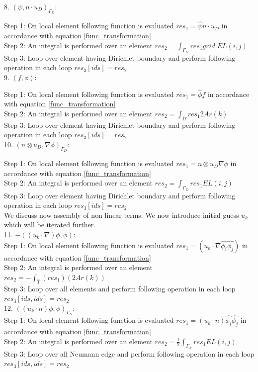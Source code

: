 \documentclass[a4paper]{book}
\begin{document}
8. $(\psi, n \cdot u_D)_{\Gamma_D} $:

Step 1: On local element following function is evaluated $res_1=\hat{\psi} n\cdot u_D$ in accordance with equation \ref{func_transformation}\\
Step 2: An integral is performed over an element $res_2=\int_{\Gamma_D} res_1 grid.EL(i,j) $\\
Step 3: Loop over element having Dirichlet boundary and perform following operation in each loop $res_3[ids]=res_2$\\

9. $(f,\phi) $:

Step 1: On local element following function is evaluated $res_1= \hat{\phi} f$ in accordance with equation \ref{func_transformation}\\
Step 2: An integral is performed over an element $res_2=\int_{\hat{\Omega}} res_1 2 Ar(k)$\\
Step 3: Loop over element having Dirichlet boundary and perform following operation in each loop $res_3[ids]=res_2$\\


10. $(n \otimes u_D,\nabla \phi)_{\Gamma_D} $:

Step 1: On local element following function is evaluated $res_1= n \otimes u_D  \nabla \phi$ in accordance with equation \ref{func_transformation}\\
Step 2: An integral is performed over an element $res_2=\int_{\Gamma_D} res_1 EL(i,j)$\\
Step 3: Loop over element having Dirichlet boundary and perform following operation in each loop $res_3[ids]=res_2$\\

We discuss now assembly of non linear terms. We now introduce initial guess $u_k$ which will be iterated further.\\

11. $-((u_k \cdot \nabla)\phi , \phi)$:\\
Step 1: On local element following function is evaluated $res_1 = (u_k \cdot \nabla \hat{\phi_i} \hat{\phi_j}) $ in accordance with equation \ref{func_transformation}\\
Step 2: An integral is performed over an element $res_2= - \int_{\hat{T}} (res_1) (2Ar(k))$\\
Step 3: Loop over all elements and perform following operation in each loop $res_3[ids,ids]=res_2$\\

12. $((u_k \cdot n)\phi , \phi)_{\Gamma_N}$:\\
Step 1: On local element following function is evaluated $res_1 = (u_k \cdot n) \hat{\phi_i} \hat{\phi_j}$ in accordance with equation \ref{func_transformation}\\
Step 2: An integral is performed over an element $res_2 = \frac{1}{2}  \int_{\Gamma_N} res_1 EL(i,j) $\\
Step 3: Loop over all Neumann edge and perform following operation in each loop $res_3[ids,ids] = res_2$\\
\end{document}

